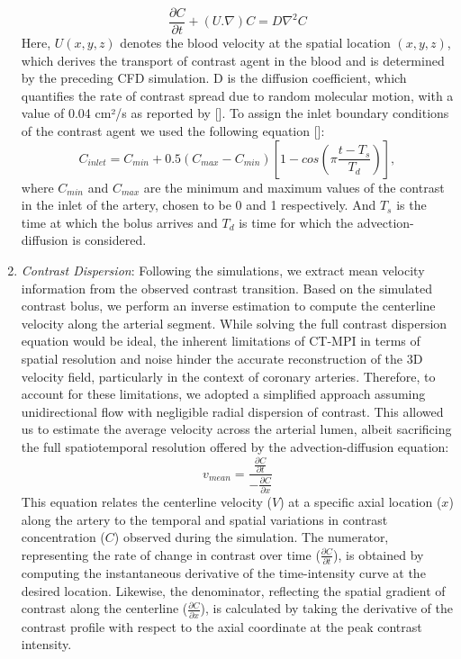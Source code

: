 \documentclass[times,twocolumn,final]{elsarticle}
\begin{document}
\begin{enumerate}
        \begin{equation}
            \dfrac{\partial C}{\partial t} + (U.\nabla )C = D\nabla ^2C
        \end{equation}
        Here, $U(x,y,z)$ denotes the blood velocity at the spatial location $(x,y,z)$, which derives the transport of contrast agent in the blood and is determined by the preceding CFD simulation. D is the diffusion coefficient, which quantifies the rate of contrast spread due to random molecular motion, with a value of 0.04 cm²/s as reported by []. To assign the inlet boundary conditions of the contrast agent we used the following equation []:
        \begin{equation}
            C_{inlet} = C_{min} + 0.5(C_{max}-C_{min})[1-cos({\pi}\frac{t-T_s}{T_d})],
        \end{equation}
        where $C_{min}$ and $C_{max}$ are the minimum and maximum values of the contrast in the inlet of the artery, chosen to be 0 and 1 respectively. And $T_s$ is the time at which the bolus arrives and $T_d$ is time for which the advection-diffusion is considered.
    \item \textit{Contrast Dispersion}: Following the simulations, we extract mean velocity information from the observed contrast transition. Based on the simulated contrast bolus, we perform an inverse estimation to compute the centerline velocity along the arterial segment. While solving the full contrast dispersion equation would be ideal, the inherent limitations of CT-MPI in terms of spatial resolution and noise hinder the accurate reconstruction of the 3D velocity field, particularly in the context of coronary arteries. Therefore, to account for these limitations, we adopted a simplified approach assuming unidirectional flow with negligible radial dispersion of contrast. This allowed us to estimate the average velocity across the arterial lumen, albeit sacrificing the full spatiotemporal resolution offered by the advection-diffusion equation:
        \begin{equation}
            v_{mean} = \dfrac{\frac{\partial C}{\partial t}}{-\frac{\partial C}{\partial x}}
        \end{equation}
        This equation relates the centerline velocity ($V$) at a specific axial location ($x$) along the artery to the temporal and spatial variations in contrast concentration ($C$) observed during the simulation. The numerator, representing the rate of change in contrast over time ($\frac{\partial C}{\partial t}$), is obtained by computing the instantaneous derivative of the time-intensity curve at the desired location. Likewise, the denominator, reflecting the spatial gradient of contrast along the centerline ($\frac{\partial C}{\partial x}$), is calculated by taking the derivative of the contrast profile with respect to the axial coordinate at the peak contrast intensity.

\end{enumerate}
\end{document}
